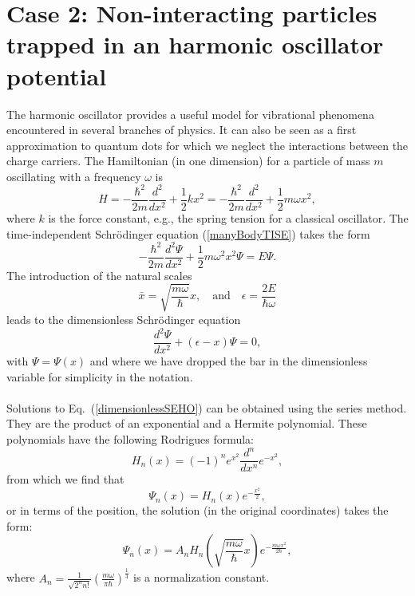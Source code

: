 \section{Case 2: Non-interacting particles trapped in an harmonic oscillator potential}
The harmonic oscillator provides a useful model for vibrational phenomena encountered in several branches of physics. It can also be seen as a first approximation to quantum dots for which we neglect the interactions between the charge carriers.
The Hamiltonian (in one dimension) for a particle of mass $m$ oscillating with a frequency $\omega$ is
\begin{equation}
H=-\frac{\hbar^2}{2m}\frac{d^2}{dx^2}+\frac{1}{2}kx^2 = -\frac{\hbar^2}{2m}\frac{d^2}{dx^2}+\frac{1}{2}m \omega x^2,
\end{equation}
where $k$ is the force constant, e.g., the spring tension for a classical oscillator. The time-independent Schr\"odinger equation (\ref{manyBodyTISE}) takes the form 
\begin{equation}
 \boxed{-\frac{\hbar^2}{2 m} \frac{d^2 \Psi}{dx^2} + \frac{1}{2} m \omega^2 x^2 \Psi = E \Psi.}
\end{equation}
The introduction of the natural scales
\begin{equation}\label{scalesHO}
\bar{x} = \sqrt{\frac{m \omega}{\hbar}} x, \quad \text{and} \quad \epsilon = \frac{2E}{\hbar \omega}
\end{equation}
leads to the dimensionless Schr\"odinger equation
\begin{equation}\label{dimensionlessSEHO}
 \frac{d^2 \Psi}{dx^2} + (\epsilon - x) \Psi = 0,
\end{equation}
with $\Psi = \Psi(x)$ and where we have dropped the bar in the dimensionless variable for simplicity in the notation.\\
\\
\noindent
Solutions to Eq.~(\ref{dimensionlessSEHO}) can be obtained using the series method\cite{Boas2006, McMahon2006}. They are the product of an exponential and a Hermite polynomial. These polynomials have the following Rodrigues formula:
\begin{equation}\label{HermitianPol}
 H_n(x) = (-1)^n e^{x^2} \frac{d^n}{dx^n} e^{-x^2},
\end{equation}
from which we find that
$$\Psi_n(x) = H_n(x) e^{-\frac{x^2}{2}},$$ 
or in terms of the position, the solution (in the original coordinates) takes the form:
\begin{equation}
\boxed{\Psi_n(x) = A_n H_n\left(\sqrt{\frac{m\omega}{\hbar}} x \right) e^{-\frac{m\omega x^2}{2 \hbar}},}
\end{equation}
where $A_n = \frac{1}{\sqrt{2^n n!}} \left(\frac{m \omega}{\pi \hbar}\right)^{\frac{1}{4}}$ is a normalization constant.\\


